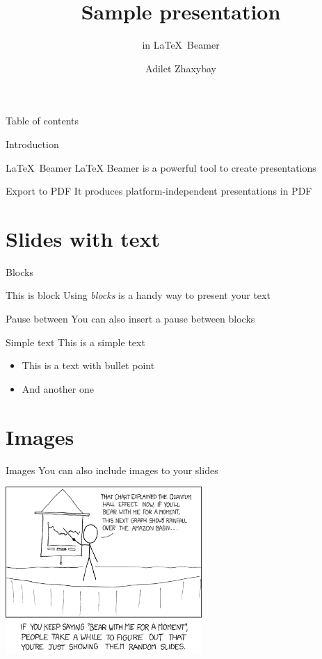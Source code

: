 \documentclass{beamer}
\title{Sample presentation}
\subtitle{in \LaTeX\ Beamer}
\institute{Nazarbayev University}
\author{Adilet Zhaxybay}
\begin{document}
\begin{frame}
	\titlepage
\end{frame}

\begin{frame}{Table of contents}
  \tableofcontents
\end{frame}

\begin{frame}{Introduction}
	\begin{block}{\LaTeX\ Beamer}
		LaTeX Beamer is a powerful tool to create presentations
	\end{block}
	\pause
	\begin{block}{Export to PDF}
		It produces platform-independent presentations in PDF
	\end{block}	
\end{frame}

\section{Slides with text}

\begin{frame}{Blocks}
	\begin{block}{This is block}
		Using \textit{blocks} is a handy way to present your text
	\end{block}
	\pause
	\begin{block}{Pause between}
		You can also insert a pause between blocks
	\end{block}	
\end{frame}

\begin{frame}{Simple text}
	This is a simple text
	\pause
	\begin{itemize}
		\item This is a text with bullet point
		\pause
		\item And another one
	\end{itemize}
\end{frame}

\section{Images}

\begin{frame}{Images}
	You can also include images to your slides
	\newline\newline
	\centerline{\includegraphics[height=2.5in]{slides.png}}
\end{frame}
\end{document}
